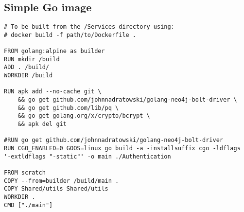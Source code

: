 \documentclass[]{article}
\newcommand{\<}{\guilsinglleft}
\renewcommand{\>}{\guilsinglright}
\begin{document}
\subsection{Simple Go image}
\begin{lstlisting}
# To be built from the /Services directory using:
# docker build -f path/to/Dockerfile .

FROM golang:alpine as builder
RUN mkdir /build
ADD . /build/
WORKDIR /build

RUN apk add --no-cache git \
	&& go get github.com/johnnadratowski/golang-neo4j-bolt-driver \
	&& go get github.com/lib/pq \
	&& go get golang.org/x/crypto/bcrypt \
	&& apk del git

#RUN go get github.com/johnnadratowski/golang-neo4j-bolt-driver
RUN CGO_ENABLED=0 GOOS=linux go build -a -installsuffix cgo -ldflags '-extldflags "-static"' -o main ./Authentication

FROM scratch
COPY --from=builder /build/main .
COPY Shared/utils Shared/utils
WORKDIR .
CMD ["./main"]
\end{lstlisting}
\end{document}
